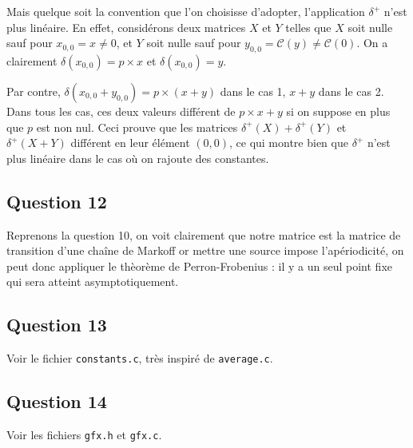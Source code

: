 \documentclass{article}
\begin{document}
Mais quelque soit la convention que l'on choisisse d'adopter, l'application $\delta^+$ n'est plus linéaire. En effet, considérons deux matrices $X$ et $Y$ telles que $X$ soit nulle sauf pour $x_{0,0} = x \neq 0$, et $Y$ soit nulle sauf pour $y_{0,0} = \mathcal{C}(y) \neq \mathcal{C}(0)$.
On a clairement $\delta(x_{0,0}) = p \times x$ et $\delta(x_{0,0}) = y$.

Par contre, $\delta(x_{0,0} + y_{0,0}) = p \times (x+y)$ dans le cas 1, $x+y$ dans le cas 2. Dans tous les cas, ces deux valeurs différent de $p \times x + y$ si on suppose en plus que $p$ est non nul. Ceci prouve que les matrices $\delta^+(X) + \delta^+(Y)$ et $\delta^+(X+Y)$ différent en leur élément $(0,0)$, ce qui montre bien que $\delta^+$ n'est plus linéaire dans le cas où on rajoute des constantes.

\subsection*{Question 12}

Reprenons la question 10, on voit clairement que notre matrice est la matrice de transition d'une chaîne de Markoff or mettre une source impose l'apériodicité,
on peut donc appliquer le thèorème de Perron-Frobenius : il y a un seul point fixe qui sera atteint asymptotiquement.


\subsection*{Question 13}

Voir le fichier \texttt{constants.c}, très inspiré de \texttt{average.c}.

\subsection*{Question 14}

Voir les fichiers \texttt{gfx.h} et \texttt{gfx.c}.
\end{document}
